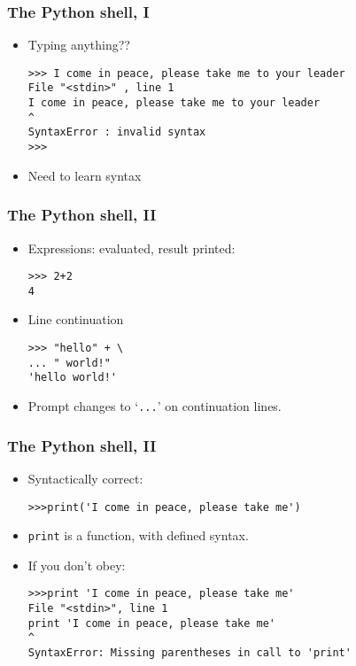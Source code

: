 \begin{frame}[fragile]  \frametitle{The Python shell, I}
  \begin{itemize}
 \item Typing anything??
\begin{lstlisting}
>>> I come in peace, please take me to your leader
File "<stdin>" , line 1
I come in peace, please take me to your leader
^
SyntaxError : invalid syntax
>>>
\end{lstlisting}
\item Need to learn syntax
\end{itemize}
\end{frame}

\begin{frame}[fragile]\frametitle{The Python shell, II}
\begin{itemize}
\item Expressions: evaluated, result printed:
\begin{lstlisting}
>>> 2+2
4
\end{lstlisting}
\item Line continuation \\ 
\begin{lstlisting}
>>> "hello" + \
... " world!"
'hello world!'
\end{lstlisting}
\item Prompt changes to `\texttt{...}' on continuation lines.
\end{itemize}
\end{frame}

\begin{frame}[fragile]\frametitle{The Python shell, II}
\begin{itemize}
\item Syntactically correct:
	\begin{lstlisting}
>>>print('I come in peace, please take me')
	\end{lstlisting}

\item \lstinline|print| is a function, with defined syntax. 
\item If you don't obey: \\ 
\begin{lstlisting}
>>>print 'I come in peace, please take me'
File "<stdin>", line 1
print 'I come in peace, please take me'
^
SyntaxError: Missing parentheses in call to 'print'
\end{lstlisting}
\end{itemize}
\end{frame}

